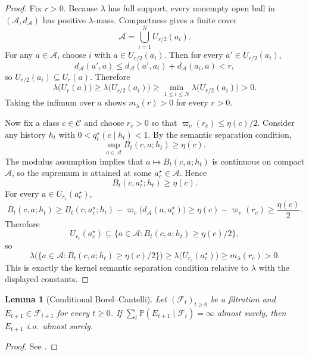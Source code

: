 \documentclass[11pt]{article}
\newtheorem{lemma}[theorem]{Lemma}
\theoremstyle{definition}
\theoremstyle{remark}
\newcommand{\Acal}{\mathcal{A}}
\newcommand{\Ccal}{\mathcal{C}}
\newcommand{\Prob}{\mathbb{P}}
\begin{document}
\begin{proof}
Fix $r>0$. Because $\lambda$ has full support, every nonempty open ball in $(\Acal,d_\Acal)$ has positive $\lambda$-mass. Compactness gives a finite cover
\[
\Acal=\bigcup_{i=1}^N U_{r/2}(a_i).
\]
For any $a\in\Acal$, choose $i$ with $a\in U_{r/2}(a_i)$. Then for every $a'\in U_{r/2}(a_i)$,
\[
d_\Acal(a',a)\le d_\Acal(a',a_i)+d_\Acal(a_i,a)<r,
\]
so $U_{r/2}(a_i)\subseteq U_r(a)$. Therefore
\[
\lambda\!\bigl(U_r(a)\bigr)\ge \lambda\!\bigl(U_{r/2}(a_i)\bigr)\ge \min_{1\le i\le N}\lambda\!\bigl(U_{r/2}(a_i)\bigr)>0.
\]
Taking the infimum over $a$ shows $m_\lambda(r)>0$ for every $r>0$.

Now fix a class $c\in\Ccal$ and choose $r_c>0$ so that $\varpi_c(r_c)\le \eta(c)/2$. Consider any history $h_t$ with $0<q_t^\star(c\mid h_t)<1$. By the semantic separation condition,
\[
\sup_{a\in\Acal}B_t(c,a;h_t)\ge \eta(c).
\]
The modulus assumption implies that $a\mapsto B_t(c,a;h_t)$ is continuous on compact $\Acal$, so the supremum is attained at some $a_c^\star\in\Acal$. Hence
\[
B_t(c,a_c^\star;h_t)\ge \eta(c).
\]
For every $a\in U_{r_c}(a_c^\star)$,
\[
B_t(c,a;h_t)\ge B_t(c,a_c^\star;h_t)-\varpi_c\!\bigl(d_\Acal(a,a_c^\star)\bigr)\ge \eta(c)-\varpi_c(r_c)\ge \frac{\eta(c)}{2}.
\]
Therefore
\[
U_{r_c}(a_c^\star)\subseteq \{a\in\Acal:B_t(c,a;h_t)\ge \eta(c)/2\},
\]
so
\[
\lambda\!\bigl(\{a\in\Acal:B_t(c,a;h_t)\ge \eta(c)/2\}\bigr)
\ge
\lambda\!\bigl(U_{r_c}(a_c^\star)\bigr)
\ge
m_\lambda(r_c)>0.
\]
This is exactly the kernel semantic separation condition relative to $\lambda$ with the displayed constants.
\end{proof}

\begin{lemma}[Conditional Borel--Cantelli]
\label{lem:conditional-bc}
Let $(\mathcal{F}_t)_{t\ge 0}$ be a filtration and $E_{t+1}\in\mathcal{F}_{t+1}$ for every $t\ge 0$. If $\sum_t\Prob(E_{t+1}\mid\mathcal{F}_t)=\infty$ almost surely, then $E_{t+1}$ i.o.\ almost surely.
\end{lemma}

\begin{proof}
See \citet[Chapter~12]{Williams1991}.
\end{proof}
\end{document}
